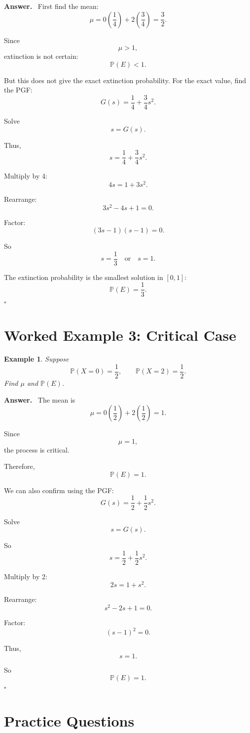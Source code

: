 \documentclass[12pt,a4paper]{article}
\theoremstyle{notestyle}
\newtheorem{example}{Example}
\newenvironment{answer}
{\par\textbf{Answer.}\ }
{\hfill$\square$\par}
\newcommand{\Prob}{\mathbb{P}}
\begin{document}
\begin{answer}
First find the mean:
\[
\mu=0\left(\frac14\right)+2\left(\frac34\right)=\frac32.
\]

Since
\[
\mu>1,
\]
extinction is not certain:
\[
\Prob(E)<1.
\]

But this does not give the exact extinction probability. For the exact value, find the PGF:
\[
G(s)=\frac14+\frac34s^2.
\]

Solve
\[
s=G(s).
\]

Thus,
\[
s=\frac14+\frac34s^2.
\]

Multiply by 4:
\[
4s=1+3s^2.
\]

Rearrange:
\[
3s^2-4s+1=0.
\]

Factor:
\[
(3s-1)(s-1)=0.
\]

So
\[
s=\frac13
\quad\text{or}\quad
s=1.
\]

The extinction probability is the smallest solution in $[0,1]$:
\[
\boxed{\Prob(E)=\frac13.}
\]
\end{answer}

\section{Worked Example 3: Critical Case}

\begin{example}
Suppose
\[
\Prob(X=0)=\frac12,\qquad \Prob(X=2)=\frac12.
\]
Find $\mu$ and $\Prob(E)$.
\end{example}

\begin{answer}
The mean is
\[
\mu=0\left(\frac12\right)+2\left(\frac12\right)=1.
\]

Since
\[
\mu=1,
\]
the process is critical.

Therefore,
\[
\boxed{\Prob(E)=1.}
\]

We can also confirm using the PGF:
\[
G(s)=\frac12+\frac12s^2.
\]

Solve
\[
s=G(s).
\]

So
\[
s=\frac12+\frac12s^2.
\]

Multiply by 2:
\[
2s=1+s^2.
\]

Rearrange:
\[
s^2-2s+1=0.
\]

Factor:
\[
(s-1)^2=0.
\]

Thus,
\[
s=1.
\]

So
\[
\Prob(E)=1.
\]
\end{answer}

\section{Practice Questions}
\end{document}
